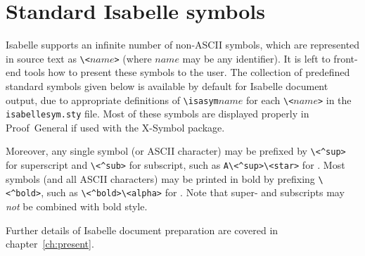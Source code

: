 

\chapter{Standard Isabelle symbols}\label{app:symbols}

Isabelle supports an infinite number of non-ASCII symbols, which are
represented in source text as \verb,\<,$name$\verb,>, (where $name$ may be any
identifier).  It is left to front-end tools how to present these symbols to
the user.  The collection of predefined standard symbols given below is
available by default for Isabelle document output, due to appropriate
definitions of \verb,\isasym,$name$ for each \verb,\<,$name$\verb,>, in the
\verb,isabellesym.sty, file.  Most of these symbols are displayed properly in
Proof~General if used with the X-Symbol package.

Moreover, any single symbol (or ASCII character) may be prefixed by
\verb,\<^sup>, for superscript and \verb,\<^sub>, for subscript, such as
\verb,A\<^sup>\<star>, for .  Most symbols (and
all ASCII characters) may be printed in bold by prefixing \verb,\<^bold>,,
such as \verb,\<^bold>\<alpha>, for \isa{\isactrlbold{\isasymalpha}}.  Note
that super- and subscripts may \emph{not} be combined with bold style.

Further details of Isabelle document preparation are covered in
chapter~\ref{ch:present}.

\begin{center}
  \begin{isabellebody}
      
  \end{isabellebody}
\end{center}

